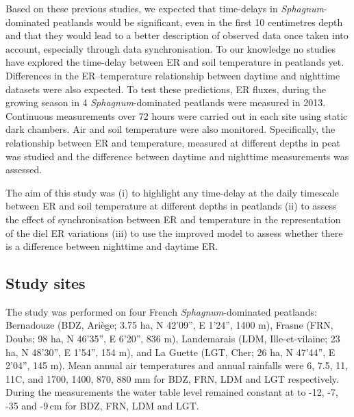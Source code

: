 Based on these previous studies, we expected that time-delays in \textit{Sphagnum}-dominated peatlands would be significant, even in the first 10 centimetres depth and that they would lead to a better description of observed data once taken into account, especially through data synchronisation.
To our knowledge no studies have explored the time-delay between ER and soil temperature in peatlands yet.
Differences in the ER--temperature relationship between daytime and nighttime datasets were also expected.
To test these predictions, ER fluxes, during the growing season in 4 \textit{Sphagnum}-dominated peatlands were measured in 2013.
Continuous measurements over 72 hours were carried out in each site using static dark chambers.
Air and soil temperature were also monitored.
Specifically, the relationship between ER and temperature, measured at different depths in peat was studied and the difference between daytime and nighttime measurements was assessed.

The aim of this study was (i) to highlight any time-delay at the daily timescale between ER and soil temperature at different depths in peatlands (ii) to assess the effect of synchronisation between ER and temperature in the representation of the diel ER variations (iii) to use the improved model to assess whether there is a difference between nighttime and daytime ER.

\subsection{Study sites}
The study was performed on four French \textit{Sphagnum}-dominated peatlands:
Bernadouze (BDZ, Ari\`ege; 3.75 ha, N 42’09”, E 1’24”, 1400 m), Frasne (FRN, Doubs; 98 ha, N 46’35”, E 6’20”, 836 m), Landemarais (LDM, Ille-et-vilaine; 23 ha, N 48’30”, E 1’54”, 154 m), and La Guette (LGT, Cher; 26 ha, N 47’44”, E 2’04”, 145 m).
Mean annual air temperatures and annual rainfalls were 6, 7.5, 11, 11\textdegree C, and 1700, 1400, 870, 880 mm for BDZ, FRN, LDM and LGT respectively.
During the measurements the water table level remained constant at to -12, -7, -35 and -9\,cm for BDZ, FRN, LDM and LGT.

